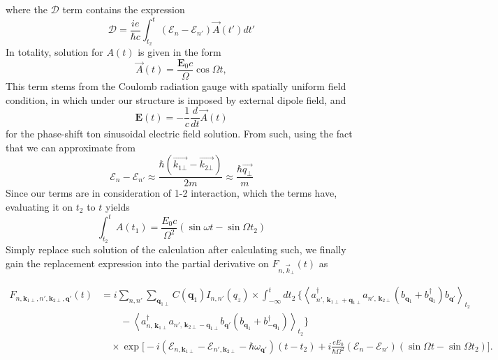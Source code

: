 \documentclass[%
 reprint,
 amsmath,amssymb,
 aps,
]{revtex4-2}
\begin{document}
where the $\mathcal{D}$ term contains the expression
\begin{equation}
    \mathcal{D} = \dfrac{ie}{\hbar c} \int^t_{t_2}\left(\mathcal{E}_n -\mathcal{E}_{n'}\right)\vec{A}(t')dt'
\end{equation}
In totality, solution for $A(t)$ is given in the form
\begin{equation}
    \vec{A}(t) = \frac{\mathbf{E}_{0}c}{\Omega} \cos{\Omega t},
\end{equation}
This term stems from the Coulomb radiation gauge with spatially uniform field condition, in which under our structure is imposed by external dipole field, and
\begin{equation}
    \mathbf{E}(t) = -\frac{1}{c} \frac{d}{dt}\vec{A}(t) 
\end{equation}
for the phase-shift ton sinusoidal electric field solution. From such, using the fact that we can approximate from
\begin{equation}
    \mathcal{E}_n-\mathcal{E}_{n'}\approx \dfrac{\hbar(\vec{k_{1\bot}}-\vec{k_{2\bot}})}{2m}\approx \dfrac{\hbar\vec{q_\bot}}{m}
\end{equation}
Since our terms are in consideration of 1-2 interaction, which the terms have, evaluating it on $t_{2}$ to $t$ yields
\begin{equation}
    \int^{t}_{t_{2}} A(t_1) = \frac{E_{0}c}{\Omega^{2}} (\sin{\omega t}-\sin{\Omega t_2}) 
\end{equation}
Simply replace such solution of the calculation after calculating such, we finally gain the replacement expression into the partial derivative on $F_{n,\vec{k}_{\perp}}(t)$ as
\begin{widetext}
\begin{align}
F_{n,\mathbf{k}_{1\perp},n',\mathbf{k}_{2\perp},\mathbf{q}'}(t)
&=
i
\sum_{n,n'}
\sum_{\mathbf{q}_{1\perp}}
C(\mathbf{q}_1)
I_{n,n'}(q_z)
\nonumber \times
\int_{-\infty}^{t}
dt_2\,
\Bigg\{
\left\langle
a^\dagger_{n',\,\mathbf{k}_{1\perp}+\mathbf{q}_{1\perp}}
a_{n',\,\mathbf{k}_{2\perp}}
\left(b_{\mathbf{q}_1}+b^\dagger_{\mathbf{q}_1}\right)
b_{\mathbf{q}'}
\right\rangle_{t_2}
\nonumber\\
&\qquad
-
\left\langle
a^\dagger_{n,\,\mathbf{k}_{1\perp}}
a_{n',\,\mathbf{k}_{2\perp}-\mathbf{q}_{1\perp}}
b_{\mathbf{q}'}
\left(b_{\mathbf{q}_1}+b^\dagger_{-\mathbf{q}_1}\right)
\right\rangle_{t_2}
\Bigg\}
\nonumber\\
&\quad \times
\exp\Bigg[
-i
\left(
\mathcal{E}_{n,\mathbf{k}_{1\perp}}
-
\mathcal{E}_{n',\mathbf{k}_{2\perp}}
-
\hbar\omega_{\mathbf{q}'}
\right)
(t-t_2)
\nonumber
+
i
\frac{eE_0}{\hbar\Omega^{2}}
\left(
\mathcal{E}_n-\mathcal{E}_{n'}
\right)
\left(
\sin\Omega t-\sin\Omega t_2
\right)
\Bigg].
\end{align}
\end{widetext}
\end{document}
